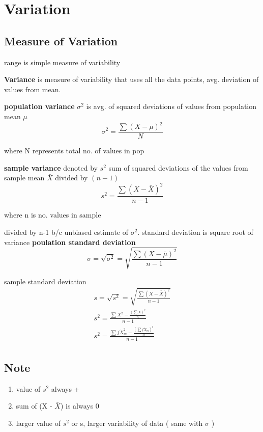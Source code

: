 \documentclass[11pt]{amsart}
\begin{document}
\section{Variation}
\subsection{Measure of Variation}
\par range is simple measure of variability
\par \textbf{Variance} is measure of variability that uses all the data points, avg. deviation of values from mean.
\par \textbf{population variance} $\sigma^2$ is avg. of squared deviations of values from population mean $\mu$
\begin{equation}
\sigma^2 = \frac{\sum{(X-\mu)^2}}{N}
\end{equation}
\par where N represents total no. of values in pop
\par \textbf{sample variance} denoted by $s^2$ sum of squared deviations of the values from sample mean $\bar{X}$ divided by $(n-1)$
\begin{equation}
s^2 = \frac {\sum{(X-\bar{X})^2}}{n-1}
\end{equation}
\par where n is no. values in sample
\par divided by n-1  b/c unbiased estimate of $\sigma^2$. standard deviation is square root of variance
\textbf{poulation standard deviation}
\begin{equation}
\sigma  = \sqrt{\sigma^2} = \sqrt {\frac{\sum{(X-\bar{\mu})^2}}{n-1}}
\end{equation}
\par sample standard deviation
\begin{equation}
\begin{split}
s  = \sqrt{s^2} = \sqrt {\frac{\sum{(X-\bar{X})^2}}{n-1}} \\
s^2 = \frac{\sum{X^2 - \frac{(\sum X)^2}{n}}}{n-1} \\
s^2 = \frac{\sum{f \dot X_m^2 - \frac{(\sum f \dot X_m)^2}{n}}}{n-1} \\
\end{split}
\end{equation}
\subsection{Note}
\begin{enumerate}
\item value of $s^2$ always +
\item sum of (X - $\bar{X}$) is always 0
\item larger value of $s^2$ or s, larger variability of data ( same with $\sigma$ )
\end{enumerate}
\end{document}
